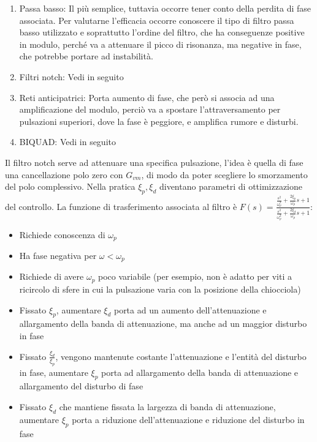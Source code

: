 \begin{enumerate}[label=\roman*.]
\begin{enumerate}[label=\alph*)]
            \item Passa basso: Il più semplice, tuttavia occorre tener conto della perdita di fase associata.
            Per valutarne l'efficacia occorre conoscere il tipo di filtro passa basso utilizzato e soprattutto l'ordine del filtro, che ha conseguenze positive in modulo, perché va a attenuare il picco di risonanza, ma negative in fase, che potrebbe portare ad instabilità.
            \item Filtri notch: Vedi in seguito
            \item Reti anticipatrici: Porta aumento di fase, che però si associa ad una amplificazione del modulo, perciò va a spostare l'attraversamento per pulsazioni superiori, dove la fase è peggiore, e amplifica rumore e disturbi.
            \item BIQUAD: Vedi in seguito
        \end{enumerate}
\end{enumerate}

Il filtro notch serve ad attenuare una specifica pulsazione, l'idea è quella di fase una cancellazione polo zero con \(G_{vm}\), di modo da poter scegliere lo smorzamento del polo complessivo. Nella pratica \(\xi_p,\xi_d\) diventano parametri di ottimizzazione del controllo.
La funzione di trasferimento associata al filtro è \(F(s) = \frac{\frac{s^2}{\omega_p^2} + \frac{2\xi_p}{\omega_p}s + 1}{\frac{s^2}{\omega_p^2} + \frac{2\xi_d}{\omega_p}s + 1}\):
\begin{itemize}
    \item Richiede conoscenza di \(\omega_p\)
    \item Ha fase negativa per \(\omega < \omega_p\)
    \item Richiede di avere \(\omega_p\) poco variabile (per esempio, non è adatto per viti a ricircolo di sfere in cui la pulsazione varia con la posizione della chiocciola)
    \item Fissato \(\xi_p\), aumentare \(\xi_d\) porta ad un aumento dell'attenuazione e allargamento della banda di attenuazione, ma anche ad un maggior disturbo in fase
    \item Fissato \(\frac{\xi_d}{\xi_p}\), vengono mantenute costante l'attenuazione e l'entità del disturbo in fase, aumentare \(\xi_p\) porta ad allargamento della banda di attenuazione e allargamento del disturbo di fase
    \item Fissato \(\xi_d\) che mantiene fissata la largezza di banda di attenuazione, aumentare \(\xi_p\) porta a riduzione dell'attenuazione e riduzione del disturbo in fase
\end{itemize}

